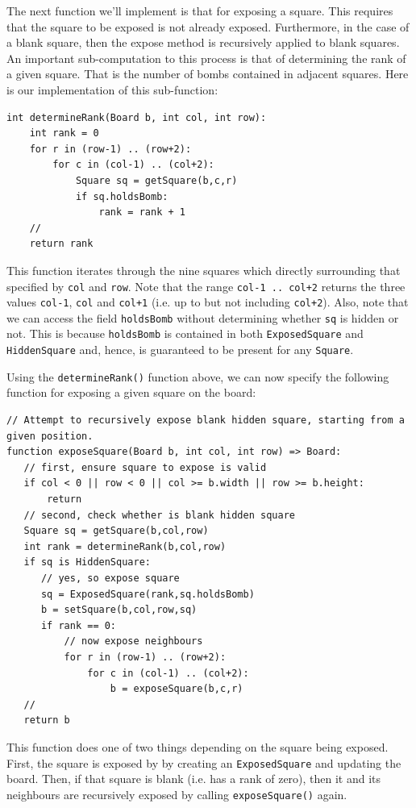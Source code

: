 The next function we'll implement is that for exposing a square.  This requires that the square to be exposed is not already exposed.  Furthermore, in the case of a blank square, then the expose method is recursively applied to blank squares.  An important sub-computation to this process is that of determining the rank of a given square.  That is the number of bombs contained in adjacent squares.  Here is our implementation of this sub-function:

\begin{lstlisting}
int determineRank(Board b, int col, int row):
    int rank = 0
    for r in (row-1) .. (row+2):
        for c in (col-1) .. (col+2):
            Square sq = getSquare(b,c,r)
            if sq.holdsBomb:
                rank = rank + 1
    //
    return rank
\end{lstlisting}

This function iterates through the nine squares which directly surrounding that specified by \lstinline{col} and \lstinline{row}.  Note that the range \lstinline{col-1 .. col+2} returns the three values \lstinline{col-1}, \lstinline{col} and \lstinline{col+1} (i.e. up to but not including \lstinline{col+2}).  Also, note that we can access the field \lstinline{holdsBomb} without determining whether \lstinline{sq} is hidden or not.  This is because \lstinline{holdsBomb} is contained in both \lstinline{ExposedSquare} and \lstinline{HiddenSquare} and, hence, is guaranteed to be present for any \lstinline{Square}.

Using the \lstinline{determineRank()} function above, we can now specify the following function for exposing a given square on the board:

\begin{lstlisting}
// Attempt to recursively expose blank hidden square, starting from a given position.
function exposeSquare(Board b, int col, int row) => Board:
   // first, ensure square to expose is valid
   if col < 0 || row < 0 || col >= b.width || row >= b.height:
       return
   // second, check whether is blank hidden square
   Square sq = getSquare(b,col,row)
   int rank = determineRank(b,col,row)
   if sq is HiddenSquare:       
      // yes, so expose square
      sq = ExposedSquare(rank,sq.holdsBomb)
      b = setSquare(b,col,row,sq)
      if rank == 0:
          // now expose neighbours
          for r in (row-1) .. (row+2):
              for c in (col-1) .. (col+2):
                  b = exposeSquare(b,c,r)
   //
   return b
\end{lstlisting}

This function does one of two things depending on the square being exposed.  First, the square is exposed by by creating an \lstinline{ExposedSquare} and updating the board.  Then, if that square is blank (i.e. has a rank of zero), then it and its neighbours are recursively exposed by calling \lstinline{exposeSquare()} again.